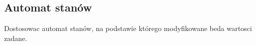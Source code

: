 \subsection{Automat stanów}
\label{lab:zad11}


%    

Dostosowac automat stanów, na podstawie którego modyfikowane beda wartosci zadane.

\newpage
